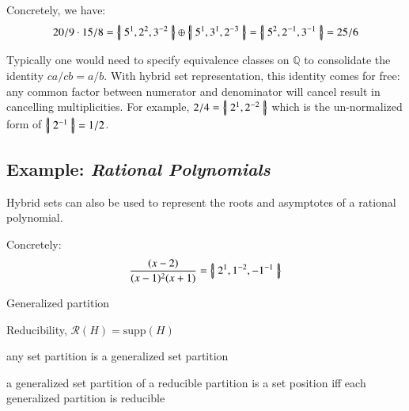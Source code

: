 \begin{example}
Concretely, we have:
\begin{equation*}
 20/9 \cdot 15/8 = \left\{ \! \left| \; 5^1, 2^2, 3^{-2} \; \right| \! \right\} \oplus \left\{ \! \left| \; 5^1, 3^1, 2^{-3} \; \right| \! \right\} = \left\{ \! \left| \; 5^2, 2^{-1}, 3^{-1} \; \right| \! \right\} = 25/6
\end{equation*}
\end{example}

Typically one would need to specify equivalence classes on $\mathbb{Q}$ to consolidate the identity $ca/cb = a/b$.
With hybrid set representation, this identity comes for free:
any common factor between numerator and denominator will cancel result in cancelling multiplicities. 
For example, $2/4 = \left\{ \! \left| \; 2^1, 2^{-2} \; \right| \! \right\}$ which is the un-normalized form of $\left\{ \! \left| \; 2^{-1} \; \right| \! \right\} = 1/2$.




\subsection{Example: \emph{Rational Polynomials}}

Hybrid sets can also be used to represent the roots and asymptotes of a rational polynomial.


\begin{example} Concretely: 
\begin{equation}
\frac{(x-2)}{(x-1)^2(x+1)} = \left\{ \! \left| \;  2^1, 1^{-2}, -1^{-1}  \; \right| \! \right\}
\end{equation}
\end{example}

\begin{definition}
Generalized partition
\end{definition}


\begin{definition}
Reducibility, $\mathcal{R}(H) = \mathrm{supp}(H)$
\end{definition}
any set partition is a generalized set partition

a generalized set partition of a reducible partition is a set position iff each generalized partition is reducible 









